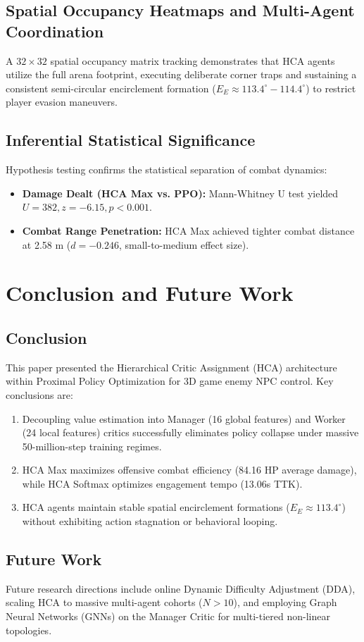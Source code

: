 \documentclass[conference]{IEEEtran}
\begin{document}
\subsection{Spatial Occupancy Heatmaps and Multi-Agent Coordination}
A $32 \times 32$ spatial occupancy matrix tracking demonstrates that HCA agents utilize the full arena footprint, executing deliberate corner traps and sustaining a consistent semi-circular encirclement formation (\(E_E \approx 113.4^\circ - 114.4^\circ\)) to restrict player evasion maneuvers.

\subsection{Inferential Statistical Significance}
Hypothesis testing confirms the statistical separation of combat dynamics:
\begin{itemize}
    \item \textbf{Damage Dealt (HCA Max vs. PPO):} Mann-Whitney U test yielded \(U = 382, z = -6.15, p < 0.001\).
    \item \textbf{Combat Range Penetration:} HCA Max achieved tighter combat distance at 2.58 m (\(d = -0.246\), small-to-medium effect size).
\end{itemize}

\section{Conclusion and Future Work}

\subsection{Conclusion}
This paper presented the Hierarchical Critic Assignment (HCA) architecture within Proximal Policy Optimization for 3D game enemy NPC control. Key conclusions are:
\begin{enumerate}
    \item Decoupling value estimation into Manager (16 global features) and Worker (24 local features) critics successfully eliminates policy collapse under massive 50-million-step training regimes.
    \item HCA Max maximizes offensive combat efficiency (84.16 HP average damage), while HCA Softmax optimizes engagement tempo (13.06s TTK).
    \item HCA agents maintain stable spatial encirclement formations (\(E_E \approx 113.4^\circ\)) without exhibiting action stagnation or behavioral looping.
\end{enumerate}

\subsection{Future Work}
Future research directions include online Dynamic Difficulty Adjustment (DDA), scaling HCA to massive multi-agent cohorts (\(N > 10\)), and employing Graph Neural Networks (GNNs) on the Manager Critic for multi-tiered non-linear topologies.



\end{document}
